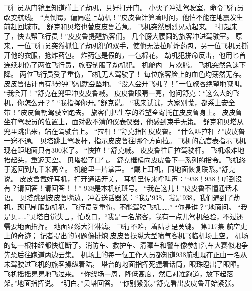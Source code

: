 \documentclass[a4paper,12pt,UTF8,twoside]{ctexbook}
\begin{document}
        飞行员从门镜里知道碰上了劫机，只好打开门。 
        小伙子冲进驾驶室，命令飞行员改变航线。 
        “真倒霉，偏偏碰上劫机！”皮皮鲁计算着时问，他怕不能在地震发生前赶回城市。 
        舒克和贝塔也替皮皮鲁着急。 
        飞机突然剧烈晃动起来。 
        “打起来了，快去帮飞行员！”皮皮鲁提醒旅客们。 
        几个膀大腰圆的旅客冲进驾驶室。 
        原来，一位飞行员突然抓住了劫机犯的双手，使他无法拉响炸药包，另一位飞机员撕开他的衣服，抢炸药包。 
        炸药包是假的，一包棉花。 
        劫机犯拼命反击，他用匕首连续刺伤了两位飞行员，旅客制服了劫机犯。 
        机舱内一片欢腾。 
        飞机突然急速下降。 
        两位飞行员受了重伤，飞机无人驾驶了！ 
        每位旅客脸上的血色均荡然无存。 
        皮皮鲁估计再有3分钟飞机就会坠地。 
        “没人会开飞机？！”一位旅客绝望地喊叫。 
        “我会开！”舒克在兜里冲皮皮鲁喊。 
        皮皮鲁眼睛一亮，他问舒克：“这么大的飞机，你怎么开？” 
        “我指挥你开。”舒克说。 
        “我来试试，大家别慌，都系上安全带！”皮皮鲁朝驾驶室跑去。 
        旅客们把生存的希望全寄托在皮皮鲁身上。 
        皮皮鲁坐在驾驶员的位置上，面对数不清的仪表仪器，他感到束手无策。 
        舒克和贝塔从兜里跳出来，站在驾驶台上。 
        “拉杆！”舒克指挥皮皮鲁。 
        “什么叫拉杆？”皮皮鲁一窍不通。 
        贝塔跳上驾驶杆，指示皮皮鲁往哪个方向拉。 
        飞机的高度表指示飞机现在距地面只有300米了。 
        “快拉！”舒克喊。 
        皮皮鲁往后拉驾驶杆。 
        飞机艰难地抬起头，重返天空。 
        贝塔松了口气。 
        舒克继续向皮皮鲁下一系列的指令。飞机终于返回到九千米高空。 
        机舱里一片掌声。 
        “戴上耳机，同地面恢复联系。”舒克说。 
        皮皮鲁戴好耳机，打开通话开关， 
        耳机里传来呼叫声：“938！938！听到没有？请回答！请回答！！” 
        938是本机航班号。 
        “我在这儿！”皮皮鲁不懂通话术语。 
        贝塔跳到皮皮鲁嘴边，冲着送话器说：“我是938，我是938，我们遇到了劫机，现已制服劫机犯，飞行员受重伤，不能驾驶飞机……” 
        “你是谁？”地面问。 
        “我是贝……”贝塔自觉失言，忙改口，“我是一名旅客，我有一点儿驾机经验，不过还需要地面指挥。 
        地面显然大汗淋漓。 
        飞行不难，着陆才是关键。   第117集 
        航空史上的奇迹； 
        记者提出的问题像排炮   
        皮皮鲁操纵大型喷气客机飞临机场上空。 
        机场的每一根神经都快绷断了。消防车、救护车、清障车和警车像参加汽车大赛似地争先恐后往跑道两边云集。 
        机场上的每一位工作人员都知道938航班现在正由一名从未驾驶过飞机的旅客操纵着陆。 
        塔台的地面指挥死握着话筒，眼珠瞪出了眼眶。 
        飞机摇摇晃晃地飞过来。 
        “你绕场一周，降低高度，然后对准跑道，放下起落架。”地面指挥说。 
        “明白。”贝塔回答。 
        “你别紧张。”舒克看出皮皮鲁开始紧张。 
\end{document}

